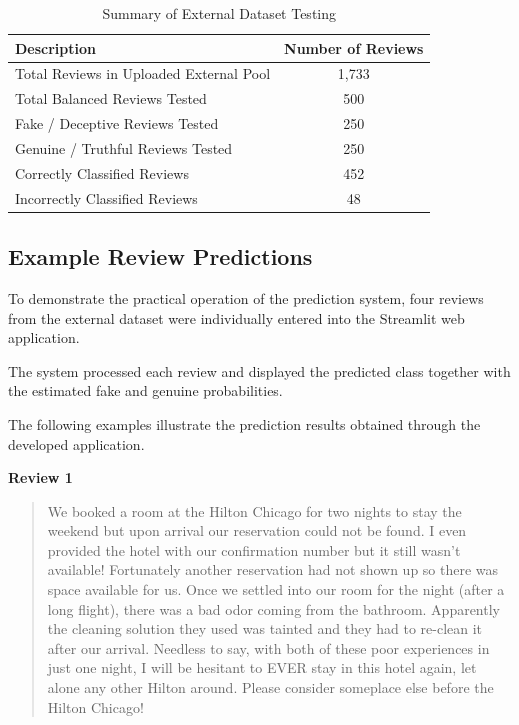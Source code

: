 \documentclass[12pt,a4paper]{report}
\begin{document}
\begin{table}[H]
\centering
\caption{Summary of External Dataset Testing}
\label{tab:external_testing_summary}

\begin{tabular}{|l|c|}
\hline
\textbf{Description} & \textbf{Number of Reviews} \\ \hline
Total Reviews in Uploaded External Pool & 1,733 \\ \hline
Total Balanced Reviews Tested & 500 \\ \hline
Fake / Deceptive Reviews Tested & 250 \\ \hline
Genuine / Truthful Reviews Tested & 250 \\ \hline
Correctly Classified Reviews & 452 \\ \hline
Incorrectly Classified Reviews & 48 \\ \hline
\end{tabular}
\end{table}

\subsection{Example Review Predictions}

To demonstrate the practical operation of the
prediction system, four reviews from the external
dataset were individually entered into the
Streamlit web application.

The system processed each review and displayed
the predicted class together with the estimated
fake and genuine probabilities.

The following examples illustrate the prediction
results obtained through the developed application.

\vspace{0.3cm}
\noindent\textbf{Review 1}

\begin{quote}
We booked a room at the Hilton Chicago for two nights to stay the
weekend but upon arrival our reservation could not be found. I even
provided the hotel with our confirmation number but it still wasn't
available! Fortunately another reservation had not shown up so there
was space available for us. Once we settled into our room for the
night (after a long flight), there was a bad odor coming from the
bathroom. Apparently the cleaning solution they used was tainted and
they had to re-clean it after our arrival. Needless to say, with both
of these poor experiences in just one night, I will be hesitant to
EVER stay in this hotel again, let alone any other Hilton around.
Please consider someplace else before the Hilton Chicago!
\end{quote}
\end{document}
